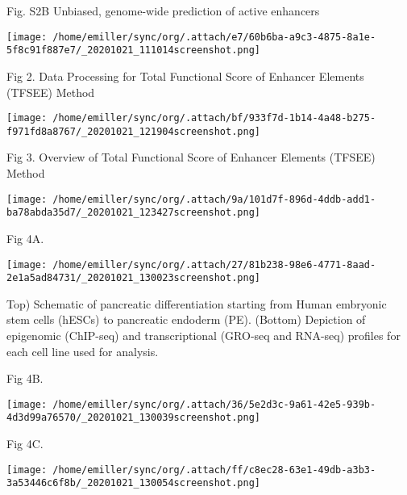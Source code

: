 \documentclass[bigger]{beamer}
\begin{document}
\begin{frame}[label={sec:org1781b03}]{Fig. S2B Unbiased, genome-wide prediction of active enhancers}
\begin{center}
\texttt{[image: /home/emiller/sync/org/.attach/e7/60b6ba-a9c3-4875-8a1e-5f8c91f887e7/\_20201021\_111014screenshot.png]}
\end{center}
\end{frame}
\begin{frame}[label={sec:org685e586}]{Fig 2. Data Processing for Total Functional Score of Enhancer Elements (TFSEE) Method}
\begin{center}
\texttt{[image: /home/emiller/sync/org/.attach/bf/933f7d-1b14-4a48-b275-f971fd8a8767/\_20201021\_121904screenshot.png]}
\end{center}
\end{frame}
\begin{frame}[label={sec:orga33a8b0}]{Fig 3. Overview of Total Functional Score of Enhancer Elements (TFSEE) Method}
\begin{center}
\texttt{[image: /home/emiller/sync/org/.attach/9a/101d7f-896d-4ddb-add1-ba78abda35d7/\_20201021\_123427screenshot.png]}
\end{center}
\end{frame}
\begin{frame}[label={sec:orgd83e7e4}]{Fig 4A.}
\begin{center}
\texttt{[image: /home/emiller/sync/org/.attach/27/81b238-98e6-4771-8aad-2e1a5ad84731/\_20201021\_130023screenshot.png]}
\end{center}

Top) Schematic of pancreatic differentiation starting from Human embryonic stem cells (hESCs) to pancreatic endoderm (PE). (Bottom) Depiction of epigenomic (ChIP-seq) and transcriptional (GRO-seq and RNA-seq) profiles for each cell line used for analysis.
\end{frame}

\begin{frame}[label={sec:org56fadb5}]{Fig 4B.}
\begin{center}
\texttt{[image: /home/emiller/sync/org/.attach/36/5e2d3c-9a61-42e5-939b-4d3d99a76570/\_20201021\_130039screenshot.png]}
\end{center}
\end{frame}

\begin{frame}[label={sec:orgdb3d26c}]{Fig 4C.}
\begin{center}
\texttt{[image: /home/emiller/sync/org/.attach/ff/c8ec28-63e1-49db-a3b3-3a53446c6f8b/\_20201021\_130054screenshot.png]}
\end{center}
\end{frame}
\end{document}

